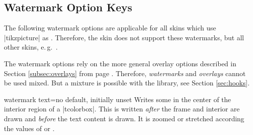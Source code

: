 \clearpage
\subsection{Watermark Option Keys}\label{subsec:watermarks}
The following watermark options are applicable for all skins which
use |tikzpicture| as .
Therefore, the skin  does not support these watermarks,
but all other skins, e.\,g.\ .

\begin{marker}
The watermark options rely on the more general overlay options described in
Section \ref{subsec:overlays} from page \pageref{subsec:overlays}.
Therefore, \emph{watermarks} and \emph{overlays} cannot be used mixed.
But a mixture is possible with the  library, see Section \ref{sec:hooks}.
\end{marker}


\begin{docTcbKey}{watermark text}{=}{no default, initially unset}
  Writes some  in the center of the interior region of a |tcolorbox|.
  This  is written \emph{after} the
  frame and interior are drawn and \emph{before} the text content is drawn.
  It is zoomed or stretched according the values of
   or .
\begin{dispExample}

\begin{tcolorbox}[enhanced,title=My title,watermark text=My Watermark]
\lipsum[1]
\tcblower
\lipsum[2]
\end{tcolorbox}
\end{dispExample}
\end{docTcbKey}

\enlargethispage*{1cm}


